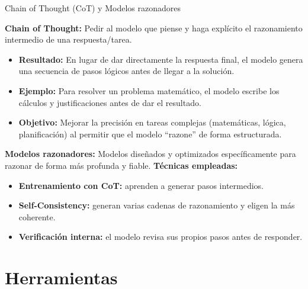 \begin{frame}{Chain of Thought (CoT) y Modelos razonadores}

\small
\textbf{Chain of Thought:} Pedir al modelo que piense y haga explícito el razonamiento intermedio de una respuesta/tarea.  

\begin{itemize}
    \item \textbf{Resultado:} En lugar de dar directamente la respuesta final, el modelo genera una secuencia de pasos lógicos antes de llegar a la solución.
    \item \textbf{Ejemplo:} Para resolver un problema matemático, el modelo escribe los cálculos y justificaciones antes de dar el resultado.
    \item \textbf{Objetivo:} Mejorar la precisión en tareas complejas (matemáticas, lógica, planificación) al permitir que el modelo “razone” de forma estructurada.
\end{itemize}

\textbf{Modelos razonadores:} Modelos diseñados y optimizados específicamente para razonar de forma más profunda y fiable. \textbf{Técnicas empleadas:}
\begin{itemize}
    \item \textbf{Entrenamiento con CoT:} aprenden a generar pasos intermedios.
    \item \textbf{Self-Consistency:} generan varias cadenas de razonamiento y eligen la más coherente.
    \item \textbf{Verificación interna:} el modelo revisa sus propios pasos antes de responder.
\end{itemize}

\end{frame}


\section{Herramientas}

